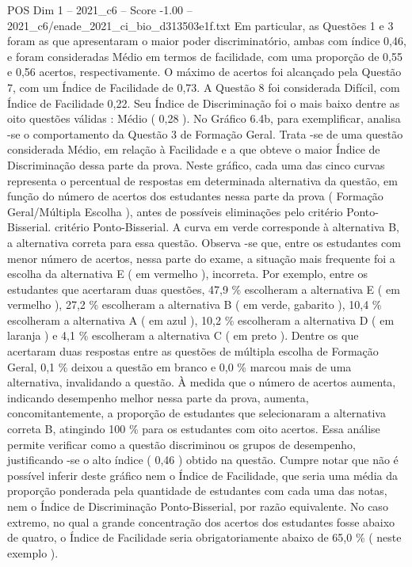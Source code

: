 \begin{textsample}{POS Dim 1 – 2021\_c6 – Score -1.00 – 2021\_c6/enade\_2021\_ci\_bio\_d313503e1f.txt}
Em particular, as Questões 1 e 3 foram as que apresentaram o maior poder discriminatório, ambas com índice 0,46, e foram consideradas Médio em termos de facilidade, com uma proporção de 0,55 e 0,56 acertos, respectivamente.
O máximo de acertos foi alcançado pela Questão 7, com um Índice de Facilidade de 0,73.
A Questão 8 foi considerada Difícil, com Índice de Facilidade 0,22.
Seu Índice de Discriminação foi o mais baixo dentre as oito questões válidas : Médio ( 0,28 ).
No Gráfico 6.4b, para exemplificar, analisa -se o comportamento da Questão 3 de Formação Geral.
Trata -se de uma questão considerada Médio, em relação à Facilidade e a que obteve o maior Índice de Discriminação dessa parte da prova.
Neste gráfico, cada uma das cinco curvas representa o percentual de respostas em determinada alternativa da questão, em função do número de acertos dos estudantes nessa parte da prova ( Formação Geral/Múltipla Escolha ), antes de possíveis eliminações pelo critério Ponto-Bisserial. critério Ponto-Bisserial.
A curva em verde corresponde à alternativa B, a alternativa correta para essa questão.
Observa -se que, entre os estudantes com menor número de acertos, nessa parte do exame, a situação mais frequente foi a escolha da alternativa E ( em vermelho ), incorreta.
Por exemplo, entre os estudantes que acertaram duas questões, 47,9 \% escolheram a alternativa E ( em vermelho ), 27,2 \% escolheram a alternativa B ( em verde, gabarito ), 10,4 \% escolheram a alternativa A ( em azul ), 10,2 \% escolheram a alternativa D ( em laranja ) e 4,1 \% escolheram a alternativa C ( em preto ).
Dentre os que acertaram duas respostas entre as questões de múltipla escolha de Formação Geral, 0,1 \% deixou a questão em branco e 0,0 \% marcou mais de uma alternativa, invalidando a questão.
À medida que o número de acertos aumenta, indicando desempenho melhor nessa parte da prova, aumenta, concomitantemente, a proporção de estudantes que selecionaram a alternativa correta B, atingindo 100 \% para os estudantes com oito acertos.
Essa análise permite verificar como a questão discriminou os grupos de desempenho, justificando -se o alto índice ( 0,46 ) obtido na questão.
Cumpre notar que não é possível inferir deste gráfico nem o Índice de Facilidade, que seria uma média da proporção ponderada pela quantidade de estudantes com cada uma das notas, nem o Índice de Discriminação Ponto-Bisserial, por razão equivalente.
No caso extremo, no qual a grande concentração dos acertos dos estudantes fosse abaixo de quatro, o Índice de Facilidade seria obrigatoriamente abaixo de 65,0 \% ( neste exemplo ).

\end{textsample}
